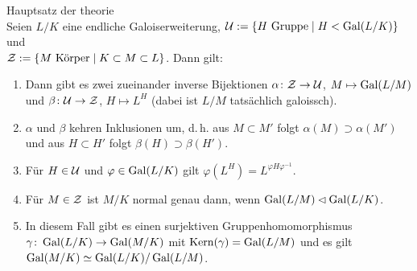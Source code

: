 \begin{Theorem}{Hauptsatz der theorie}\\
    Seien $L/K$ eine endliche Galoiserweiterung,
    $\mathcal{U} := \{H \text{ Gruppe} \;|\; H < \operatorname{Gal}(L/K)\}$ und\\
    $\mathcal{Z} := \{M \text{ Körper} \;|\; K \subset M \subset L\}$.
    Dann gilt:
    \begin{enumerate}[label=(\alph*)]
        \item
        Dann gibt es zwei zueinander inverse Bijektionen
        $\alpha\colon \mathcal{Z} \rightarrow \mathcal{U}$, $M \mapsto \operatorname{Gal}(L/M)$ und
        $\beta\colon \mathcal{U} \rightarrow \mathcal{Z}$, $H \mapsto L^H$
        (dabei ist $L/M$ tatsächlich galoissch).
        
        \item
        $\alpha$ und $\beta$ kehren Inklusionen um, d.\,h.
        aus $M \subset M'$ folgt $\alpha(M) \supset \alpha(M')$ und
        aus $H \subset H'$ folgt $\beta(H) \supset \beta(H')$.
        
        \item
        Für $H \in \mathcal{U}$ und $\varphi \in \operatorname{Gal}(L/K)$ gilt
        $\varphi(L^H) = L^{\varphi H \varphi^{-1}}$.
        
        \item
        Für $M \in \mathcal{Z}$ ist $M/K$ normal genau dann, wenn
        $\operatorname{Gal}(L/M) \mathbin{\vartriangleleft} \operatorname{Gal}(L/K)$.
        
        \item
        In diesem Fall gibt es einen surjektiven Gruppenhomomorphismus\\
        $\gamma\colon \operatorname{Gal}(L/K) \rightarrow \operatorname{Gal}(M/K)$ mit
        $\operatorname{Kern}(\gamma) = \operatorname{Gal}(L/M)$ und es gilt\\
        $\operatorname{Gal}(M/K) \simeq \operatorname{Gal}(L/K)/\operatorname{Gal}(L/M)$.
    \end{enumerate}
\end{Theorem}

\linie

